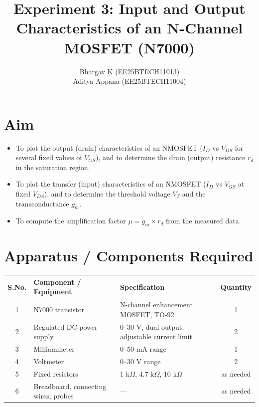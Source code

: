 \documentclass[12pt,a4paper]{article}
\title{\textbf{Experiment 3: Input and Output Characteristics of an N-Channel MOSFET (N7000)}}
\author{Bhargav K (EE25BTECH11013) \\ Aditya Appana (EE25BTECH11004)}
\date{}
\begin{document}
\maketitle

\section{Aim}
\begin{itemize}
    \item To plot the output (drain) characteristics of an NMOSFET ($I_D$ vs $V_{DS}$ for several fixed values of $V_{GS}$), and to determine the drain (output) resistance $r_d$ in the saturation region.
    \item To plot the transfer (input) characteristics of an NMOSFET ($I_D$ vs $V_{GS}$ at fixed $V_{DS}$), and to determine the threshold voltage $V_T$ and the transconductance $g_m$.
    \item To compute the amplification factor $\mu = g_m \times r_d$ from the measured data.
\end{itemize}

\section{Apparatus / Components Required}
\begin{table}[H]
\centering
\begin{tabular}{@{}cllc@{}}
\toprule
S.No. & Component / Equipment & Specification & Quantity \\
\midrule
1 & N7000 transistor & N-channel enhancement MOSFET, TO-92 & 1 \\
2 & Regulated DC power supply & 0--30 V, dual output, adjustable current limit & 2 \\
3 & Milliammeter & 0--50 mA range & 1 \\
4 & Voltmeter & 0--30 V range & 2 \\
5 & Fixed resistors & 1 k$\Omega$, 4.7 k$\Omega$, 10 k$\Omega$ & as needed \\
6 & Breadboard, connecting wires, probes & --- & as needed \\
\bottomrule
\end{tabular}
\end{table}
\end{document}
